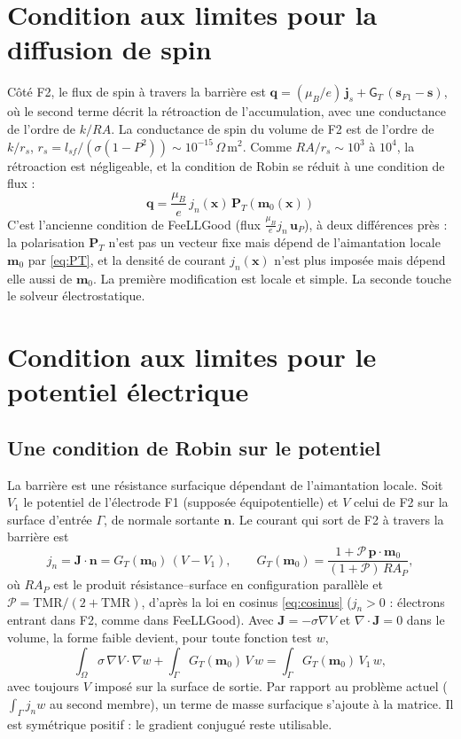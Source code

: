 \documentclass[11pt,a4paper]{article}
\newcommand{\vm}{\bm{m}}
\newcommand{\vp}{\bm{p}}
\newcommand{\vs}{\bm{s}}
\begin{document}
\section{Condition aux limites pour la diffusion de spin}

Côté F2, le flux de spin à travers la barrière est
$\bm{q} = (\mu_B/e)\,\bm{j}_s + \mathsf{G}_T\,(\vs_{F1}-\vs)$, où le second
terme décrit la rétroaction de l'accumulation, avec une conductance de
l'ordre de $k/RA$. La conductance de spin du volume de F2 est de l'ordre
de $k/r_s$, $r_s = l_{sf}/(\sigma(1-P^2))\sim10^{-15}\,\Omega\,$m$^2$. Comme
$RA/r_s\sim10^3$ à $10^4$, la rétroaction est négligeable, et la
condition de Robin se réduit à une condition de flux :
\begin{equation}
  \boxed{\;\bm{q} = \frac{\mu_B}{e}\,j_n(\bm{x})\,\bm{P}_T(\vm_0(\bm{x}))\;}
  \label{eq:tunnel-bc}
\end{equation}
C'est l'ancienne condition de FeeLLGood (flux $\frac{\mu_B}{e}j_n\,\bm{u}_P$),
à deux différences près : la polarisation $\bm{P}_T$ n'est pas un vecteur
fixe mais dépend de l'aimantation locale $\vm_0$ par \eqref{eq:PT}, et la
densité de courant $j_n(\bm{x})$ n'est plus imposée mais dépend elle aussi
de $\vm_0$. La première modification est locale et simple. La seconde
touche le solveur électrostatique.

\section{Condition aux limites pour le potentiel électrique}
\label{sec:tunnel-potentiel}

\subsection{Une condition de Robin sur le potentiel}

La barrière est une résistance surfacique dépendant de l'aimantation
locale. Soit $V_1$ le potentiel de l'électrode F1 (supposée équipotentielle)
et $V$ celui de F2 sur la surface d'entrée $\Gamma$, de normale sortante
$\bm{n}$. Le courant qui sort de F2 à travers la barrière est
\begin{equation}
  j_n = \bm{J}\cdot\bm{n} = G_T(\vm_0)\,(V - V_1),
  \qquad
  G_T(\vm_0) = \frac{1+\mathcal{P}\,\vp\cdot\vm_0}{(1+\mathcal{P})\,RA_P},
  \label{eq:GT}
\end{equation}
où $RA_P$ est le produit résistance--surface en configuration parallèle
et $\mathcal{P} = \mathrm{TMR}/(2+\mathrm{TMR})$, d'après la loi en
cosinus \eqref{eq:cosinus} ($j_n>0$ : électrons entrant dans F2, comme
dans FeeLLGood). Avec
$\bm{J} = -\sigma\nabla V$ et $\nabla\cdot\bm{J} = 0$ dans le volume, la
forme faible devient, pour toute fonction test $w$,
\begin{equation}
  \int_\Omega\sigma\,\nabla V\cdot\nabla w
  + \int_\Gamma G_T(\vm_0)\,V\,w
  = \int_\Gamma G_T(\vm_0)\,V_1\,w ,
\end{equation}
avec toujours $V$ imposé sur la surface de sortie. Par rapport au problème
actuel ($\int_\Gamma j_n w$ au second membre), un terme de masse surfacique
s'ajoute à la matrice. Il est symétrique positif : le gradient conjugué
reste utilisable.
\end{document}

